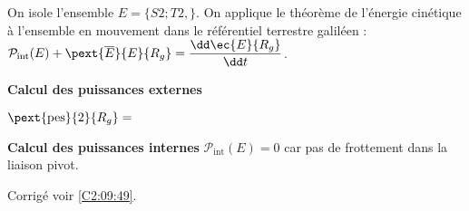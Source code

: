\else
\fi

\ifprof

	 On isole l'ensemble $E=\{S2 ; T2,\}$. On applique le théorème de l’énergie cinétique à l’ensemble en mouvement dans le référentiel terrestre galiléen : 
	 $\mathcal{P}_{\text{int}}(E)+\pext{\overline{E}}{E}{R_g} = \dfrac{\dd \ec{E}{R_g} }{\dd t}$.

\textbf{Calcul des puissances externes}

$\pext{\text{pes}}{2}{R_g} = $


\textbf{	Calcul des puissances internes}
 $\mathcal{P}_{\text{int}}(E)=0$ car pas de frottement dans la liaison pivot.


\else
\fi






\ifprof
\else
\begin{flushright}
\footnotesize{Corrigé  voir \ref{C2:09:49}.}
\end{flushright}%
\fi